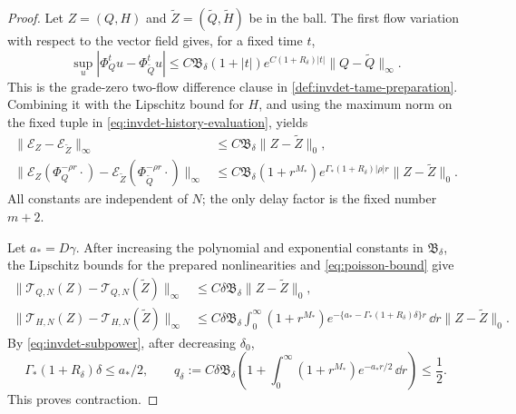 \begin{proof}
Let \(Z=(Q,H)\) and \(\widetilde Z=(\widetilde Q,\widetilde H)\) be in the
ball.  The first flow variation with respect to the vector field gives,
for a fixed time \(t\),
\begin{equation}
 \sup_u|\Phi_Q^tu-\Phi_{\widetilde Q}^tu|
 \leq C\mathfrak B_\delta(1+|t|)e^{C(1+R_\delta)|t|}
       \|Q-\widetilde Q\|_\infty.                    \label{eq:invdet-flow-difference}
\end{equation}
This is the grade-zero two-flow difference clause in
\cref{def:invdet-tame-preparation}.  Combining it with the Lipschitz bound for
\(H\), and using the maximum norm on the fixed tuple in
\cref{eq:invdet-history-evaluation}, yields
\begin{align}
 \|\mathcal E_Z-\mathcal E_{\widetilde Z}\|_\infty
 &\leq C\mathfrak B_\delta\|Z-\widetilde Z\|_0,
                                                               \label{eq:invdet-E-difference}\\
 \|\mathcal E_Z(\Phi_Q^{-\rho r}\cdot)
       -\mathcal E_{\widetilde Z}
          (\Phi_{\widetilde Q}^{-\rho r}\cdot)\|_\infty
 &\leq C\mathfrak B_\delta(1+r^{M_*})
       e^{\Gamma_*(1+R_\delta)|\rho|r}
       \|Z-\widetilde Z\|_0.                         \label{eq:invdet-shifted-E-difference}
\end{align}
All constants are independent of \(N\); the only delay factor is the fixed
number \(m+2\).

Let \(a_*=D\gamma\).  After increasing the polynomial and exponential
constants in \(\mathfrak B_\delta\), the Lipschitz bounds for the prepared
nonlinearities and \cref{eq:poisson-bound} give
\begin{align}
 \|\mathcal T_{Q,N}(Z)-\mathcal T_{Q,N}(\widetilde Z)\|_\infty
 &\leq C\delta\mathfrak B_\delta\|Z-\widetilde Z\|_0,
                                                               \label{eq:invdet-TQ-difference}\\
 \|\mathcal T_{H,N}(Z)-\mathcal T_{H,N}(\widetilde Z)\|_\infty
 &\leq C\delta\mathfrak B_\delta
 \int_0^\infty(1+r^{M_*})
 e^{-\{a_*-\Gamma_*(1+R_\delta)\delta\}r}\,\dd r
 \|Z-\widetilde Z\|_0.                              \label{eq:invdet-TH-difference}
\end{align}
By \cref{eq:invdet-subpower}, after decreasing \(\delta_0\),
\begin{equation}
 \Gamma_*(1+R_\delta)\delta\leq a_*/2,
 \qquad
 q_\delta:=C\delta\mathfrak B_\delta
 \left(1+\int_0^\infty(1+r^{M_*})e^{-a_*r/2}\,\dd r\right)
 \leq\frac12.                                        \label{eq:invdet-contraction-factor}
\end{equation}
This proves contraction.


\end{proof}
